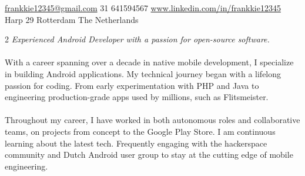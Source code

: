 \documentclass[10pt,a4paper]{article}
\begin{document}
\sloppy  %


\nobreakvspace{0.3em}  %

\noindent\href{mailto:frankkie12345@gmail.com}{frankkie12345\mbox{}@\mbox{}gmail.com}\sbull
\textsmaller{+}31 641594567\sbull
\href{http://www.linkedin.com/in/frankkie12345}{www.linkedin.com/in/frankkie12345}
\\
Harp 29\sbull
Rotterdam\sbull
The Netherlands

\spacedhrule{0.9em}{-0.4em}  %


\vspace{-1.3em}  %
\begin{multicols}{2}  %
\noindent \emph{Experienced Android Developer with a passion for open-source software.}
\\
\\
With a career spanning over a decade in native mobile development, I specialize in building Android applications. My technical journey began with a lifelong passion for coding. From early experimentation with PHP and Java to engineering production-grade apps used by millions, such as Flitsmeister.
\\
\\
Throughout my career, I have worked in both autonomous roles and collaborative teams, on projects from concept to the Google Play Store. I am continuous learning about the latest tech. Frequently engaging with the hackerspace community and Dutch Android user group to stay at the cutting edge of mobile engineering.
\end{multicols}

\spacedhrule{0em}{-0.4em}

\end{document}
